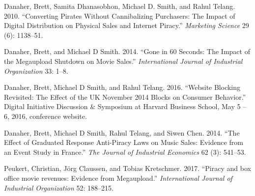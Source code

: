 \documentclass[
  11pt,
]{article}
\newlength{\cslhangindent}
\newlength{\cslentryspacingunit} %
\newenvironment{CSLReferences}[2] %
 {%
  \setlength{\parindent}{0pt}
  \ifodd #1
  \let\oldpar\par
  \def\par{\hangindent=\cslhangindent\oldpar}
  \fi
  \setlength{\parskip}{#2\cslentryspacingunit}
 }%
 {}
\begin{document}
\hypertarget{refs}{}
\begin{CSLReferences}{1}{0}
\leavevmode{}%
Danaher, Brett, Samita Dhanasobhon, Michael D. Smith, and Rahul Telang.
2010. {``Converting Pirates Without Cannibalizing Purchasers: The Impact
of Digital Distribution on Physical Sales and Internet Piracy.''}
\emph{Marketing Science} 29 (6): 1138--51.

\leavevmode{}%
Danaher, Brett, and Michael D Smith. 2014. {``Gone in 60 Seconds: The
Impact of the Megaupload Shutdown on Movie Sales.''} \emph{International
Journal of Industrial Organization} 33: 1--8.

\leavevmode{}%
Danaher, Brett, Michael D Smith, and Rahul Telang. 2016. {``Website
Blocking Revisited: The Effect of the UK November 2014 Blocks on
Consumer Behavior.''} Digital Initiative Discussion \& Symposium at
Harvard Business School, May 5 -- 6, 2016, conference website.

\leavevmode{}%
Danaher, Brett, Michael D Smith, Rahul Telang, and Siwen Chen. 2014.
{``The Effect of Graduated Response Anti-Piracy Laws on Music Sales:
Evidence from an Event Study in France.''} \emph{The Journal of
Industrial Economics} 62 (3): 541--53.

\leavevmode{}%
Peukert, Christian, Jörg Claussen, and Tobias Kretschmer. 2017.
{``{Piracy and box office movie revenues: Evidence from Megaupload}.''}
\emph{International Journal of Industrial Organization} 52: 188--215.

\end{CSLReferences}
\end{document}
